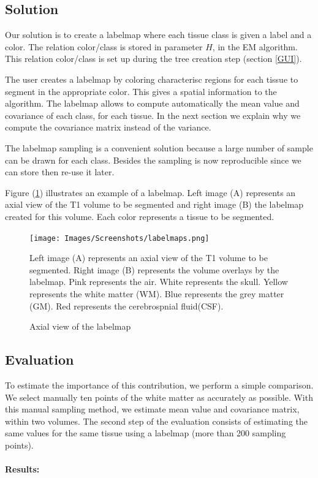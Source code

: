 \subsection{Solution}
%
Our solution is to create a labelmap where each tissue class is given a label and a color. The relation color/class is stored in parameter $H$, in the EM algorithm. This relation color/class is set up during the tree creation step (section  \ref{GUI}).
\par
The user creates a labelmap by coloring characterisc regions for each tissue to segment in the appropriate color. This gives a spatial information to the algorithm. The labelmap allows to compute automatically the mean value and covariance of each class, for each tissue. In the next section we explain why we compute the covariance matrix instead of the variance.
\par 
The labelmap sampling is a convenient solution because a large number of sample can be drawn for each class. Besides the sampling is now reproducible since we can store then re-use it later.

Figure (\ref{fig:labelmaps}) illustrates an example of a labelmap. Left image (A) represents an axial view of the T1 volume to be segmented and right image (B) the labelmap created for this volume. Each color represents a tissue to be segmented.

\begin{figure}\centering
  \texttt{[image: Images/Screenshots/labelmaps.png]}
  \caption{Axial view of the labelmap}{Left image (A) represents an axial view of the T1 volume to be segmented. Right image (B) represents the volume overlays by the labelmap. Pink represents the air. White represents the skull. Yellow represents the white matter (WM). Blue represents the grey matter (GM). Red represents the cerebrospnial fluid(CSF).}\label{fig:labelmaps}
\end{figure}
\subsection{Evaluation}
To estimate the importance of this contribution, we perform a simple comparison. We select manually ten points of the white matter as accurately as possible. With this manual sampling method, we estimate mean value and covariance matrix, within two volumes. The second step of the evaluation consists of estimating the same values for the same tissue using a labelmap (more than 200 sampling points). \\ \\
\textbf{Results:}


